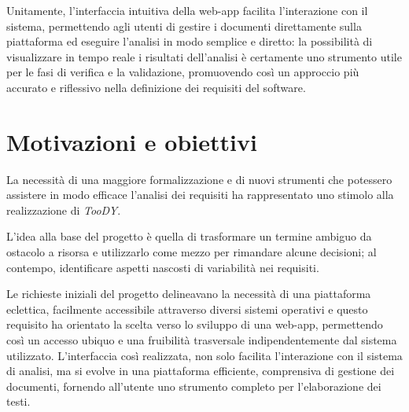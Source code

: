 \documentclass[12pt]{report}
\newcommand{\toody}{\textsl{TooDY}\xspace}
\newcommand{\flask}{\textsl{Flask}\xspace}
\begin{document}
Unitamente, l'interfaccia intuitiva della web-app facilita l'interazione con il sistema, permettendo agli utenti di gestire i documenti direttamente sulla piattaforma ed eseguire l'analisi in modo semplice e diretto: la possibilità di visualizzare in tempo reale i risultati dell'analisi è certamente uno strumento utile per le fasi di verifica e la validazione, promuovendo così un approccio più accurato e riflessivo nella definizione dei requisiti del software.



\section{Motivazioni e obiettivi}
La necessità di una maggiore formalizzazione e di nuovi strumenti che potessero assistere in modo efficace l'analisi dei requisiti ha rappresentato uno stimolo alla realizzazione di \toody.

L’idea alla base del progetto è quella di trasformare un termine ambiguo da ostacolo a risorsa e utilizzarlo come mezzo per rimandare alcune decisioni; al contempo, identificare aspetti nascosti di variabilità nei requisiti.

Le richieste iniziali del progetto delineavano la necessità di una piattaforma eclettica, facilmente accessibile attraverso diversi sistemi operativi e questo requisito ha orientato la scelta verso lo sviluppo di una web-app, permettendo così un accesso ubiquo e una fruibilità trasversale indipendentemente dal sistema utilizzato. L'interfaccia così realizzata, non solo facilita l'interazione con il sistema di analisi, ma si evolve in una piattaforma efficiente, comprensiva di gestione dei documenti, fornendo all'utente uno strumento completo per l'elaborazione dei testi.
\end{document}
